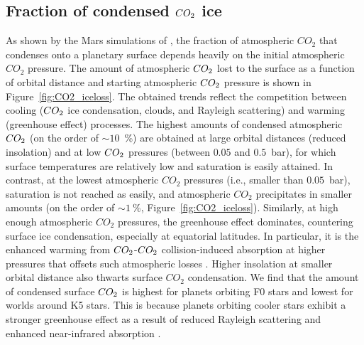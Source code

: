 \documentclass[fleqn,usenatbib]{mnras}
\begin{document}
\subsection{Fraction of condensed $CO_{\rm 2}$ ice}
As shown by the Mars simulations of \citet{Soto2015}, the fraction of atmospheric $CO_{\mathrm{2}}$ that condenses onto a planetary surface depends heavily on the initial atmospheric $CO_{\mathrm{2}}$ pressure.  The amount of atmospheric $CO_{\rm 2}$ lost to the surface as a function of orbital distance and starting atmospheric $CO_{\rm 2}$ pressure is shown in Figure~\ref{fig:CO2_iceloss}.  The obtained trends reflect the competition between cooling ($CO_{\rm 2}$ ice condensation, clouds, and Rayleigh scattering) and warming (greenhouse effect) processes.  The highest amounts of condensed atmospheric $CO_{\rm 2}$ (on the order of $\sim 10$~\%) are obtained at large orbital distances (reduced insolation) and at low $CO_{\rm 2}$ pressures (between $0.05$ and $0.5$~bar), for which surface temperatures are relatively low and saturation is easily attained. In contrast, at the lowest atmospheric $CO_{\mathrm{2}}$ pressures (i.e., smaller than $0.05$~bar), saturation is not reached as easily, and atmospheric $CO_{\mathrm{2}}$ precipitates in smaller amounts (on the order of $\sim 1~\%$, Figure~\ref{fig:CO2_iceloss}). Similarly, at high enough atmospheric $CO_{\mathrm{2}}$ pressures, 
the greenhouse effect dominates, countering surface ice condensation, especially at equatorial latitudes. In particular, it is the enhanced warming from $CO_{\rm 2}$-$CO_{\rm 2}$ collision-induced absorption at higher pressures that offsets such atmospheric losses \citep{wordsworth2010, ramirez2014}. Higher insolation at smaller orbital distance also thwarts surface $CO_{\mathrm{2}}$ condensation. We find that the amount of condensed surface $CO_{\rm 2}$ is highest for planets orbiting F0 stars and lowest for worlds around K5 stars. This is because planets orbiting cooler stars exhibit a stronger greenhouse effect as a result of reduced Rayleigh scattering and enhanced near-infrared absorption \citep{kasting1993}.
\end{document}
